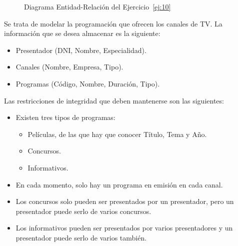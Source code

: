 \begin{ejercicio}
\begin{figure}
        \caption{Diagrama Entidad-Relación del Ejercicio~\ref{ej:10}}
        \label{fig:ej10}
    \end{figure}
\end{ejercicio}

\begin{ejercicio} \label{ej:11}
    Se trata de modelar la programación que ofrecen los canales de TV. La información que se desea almacenar
    es la siguiente:
    \begin{itemize}
        \item Presentador (DNI, Nombre, Especialidad).
        \item Canales (Nombre, Empresa, Tipo).
        \item Programas (Código, Nombre, Duración, Tipo).
    \end{itemize}
    Las restricciones de integridad que deben mantenerse son las siguientes:
    \begin{itemize}
        \item Existen tres tipos de programas:
        \begin{itemize}
            \item Películas, de las que hay que conocer Título, Tema y Año.
            \item Concursos.
            \item Informativos.
        \end{itemize}
        \item En cada momento, solo hay un programa en emisión en cada canal.
        \item Los concursos solo pueden ser presentados por un presentador, pero un presentador puede serlo de varios concursos.
        \item Los informativos pueden ser presentados por varios presentadores y un presentador puede serlo de varios también.
    \end{itemize}
\end{ejercicio}

